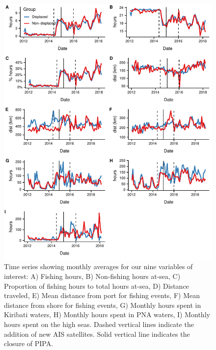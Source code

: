\documentclass[12pt]{article}
\begin{document}
\begin{figure}
	\centering
	\includegraphics{img/all_panels.pdf}
	\caption{\label{fig:all_panels}Time series showing monthly averages for our nine variables of interest: A) Fishing hours, B) Non-fishing hours at-sea, C) Proportion of fishing hours to total hours at-sea, D) Distance traveled, E) Mean distance from port for fishing events, F) Mean distance from shore for fishing events, G) Monthly hours spent in Kiribati waters, H) Monthly hours spent in PNA waters, I) Monthly hours spent on the high seas. Dashed vertical lines indicate the addition of new AIS satellites. Solid vertical line indicates the closure of PIPA.}
\end{figure}
\end{document}
